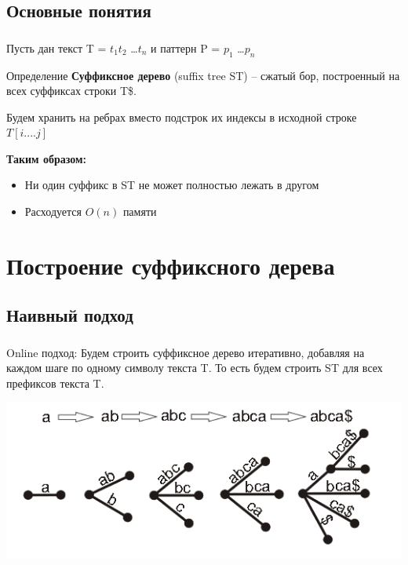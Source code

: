 \documentclass[t]{beamer}  %
\begin{document}
\subsection{Основные понятия}

\begin{frame}[c]
	\frametitle{\insertsubsection}
    
    Пусть дан текст T = $t_{1}t_{2}$ \ldots $t_{n}$ и паттерн P = $p_{1}$ \ldots $p_{n}$
    
    \pause
    \begin{block}{Определение}
    	 \textbf{Суффиксное дерево} (suffix tree ST) -- сжатый бор, построенный на всех суффиксах строки T\$.
    \end{block}
    \pause
    
    Будем хранить на ребрах вместо подстрок их индексы в исходной строке $T[i....j]$ 
    
    \pause
   	\textbf{Таким образом:} \pause
   	
    \begin{itemize}
        \item<1-> Ни один суффикс в ST не может полностью лежать в другом \pause
        \item<2-> Расходуется $O(n)$ памяти
    \end{itemize}

\end{frame}

\section{Построение суффиксного дерева}
\subsection{Наивный подход}
\begin{frame}
	\frametitle{\insertsection}
	\framesubtitle{\insertsubsection}
	\begin{block}{Online подход:}
		Будем строить суффиксное дерево итеративно, добавляя на каждом шаге по одному символу текста T. То есть будем строить ST для всех префиксов текста T.
		
		\pause
		\includegraphics[width=\linewidth]{Example1}
	\end{block}	

\end{frame}
\end{document}
